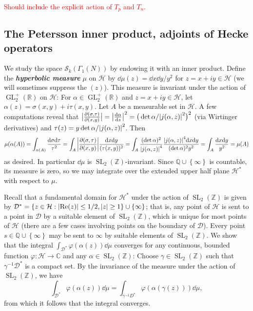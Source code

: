 \documentclass[10pt,leqno,twoside]{article}
\theoremstyle{plain}
\theoremstyle{definition}
\numberwithin{equation}{section}
\numberwithin{lem}{section}
\newcommand{\cbr}[1]{\left\{#1\right\}}
\newcommand{\textib}[1]{\textbf{\textit{#1\index{#1}}}} %
\DeclareMathOperator{\GL}{GL}
\DeclareMathOperator{\SL}{SL}
\newcommand{\slz}{\SL_2(\mathbb{Z})}
\newcommand{\glrp}{\GL_2^+(\mathbb{R})}
\newcommand{\sai}[1]{\textcolor{red}{#1}}
\begin{document}
\sai{Should include the explicit action of $T_p$ and $T_n$.}

\subsection{The Petersson inner product, adjoints of Hecke operators}
We study the space $\mathcal S_k(\varGamma_1(N))$ by endowing it with an inner product. Define the \textib{hyperbolic measure} $\mu$ on $\mathcal H$ by $\dd\mu(z) = \dd x \dd y / y^2$ for $z = x+iy\in\mathcal H$ (we will sometimes suppress the $(z)$). This measure is invariant under the action of $\glrp$ on $\mathcal H$: For $\alpha \in \glrp$ and $z=x+iy \in \mathcal H$, let $\alpha(z) = \sigma(x,y) + i\tau(x,y)$. Let $A$ be a measurable set in $\mathcal H$. A few computations reveal that $\big|\frac{\partial (\sigma,\tau)}{\partial(x,y)}\big| = \abs{\dv{\alpha}{z}}^2 = \big(\det\alpha/\abs{j(\alpha,z)}^2\big)^2$ (via Wirtinger derivatives) and $\tau(z) = y\det\alpha/\abs{j(\alpha,z)}^2$. Then \[\mu(\alpha(A)) = \int_{\alpha(A)} \frac{\dd\sigma\dd\tau}{\tau^2} = \int_{A}\bigg|\frac{\partial (\sigma,\tau)}{\partial(x,y)}\bigg|\frac{\dd x\dd y}{(\tau(x,y))^2} = \int_A \frac{(\det\alpha)^2}{\abs{j(\alpha,z)}^4}\frac{\abs{j(\alpha,z)}^4\dd x \dd y}{(\det\alpha)^2y^2} =\int_A \frac{\dd x \dd y}{y^2} = \mu(A)\]
as desired. In particular $\dd \mu$ is $\slz$-invariant. Since $\mathbb Q\cup\cbr{\infty}$ is countable, its measure is zero, so we may integrate over the extended upper half plane $\mathcal H^\ast$ with respect to $\mu$.

Recall that a fundamental domain for $\mathcal H^\ast$ under the action of $\slz$ is given by $\mathcal D^\ast = \cbr{z\in\mathcal H : \abs{\Re(z)}\leq 1/2,\abs{z}\geq 1}\cup\cbr{\infty}$; that is, any point of $\mathcal H$ is sent to a point in $\mathcal D$ by a suitable element of $\slz$, which is unique for most points of $\mathcal H$ (there are a few cases involving points on the boundary of $\mathcal D$). Every point $s\in\mathbb Q\cup\cbr{\infty}$ may be sent to $\infty$ by suitable elements of $\slz$. We show that the integral $\int_{\mathcal D^\ast} \varphi(\alpha(z))\dd \mu$ converges for any continuous, bounded function $\varphi\colon\mathcal H\to\mathbb C$ and any $\alpha\in\slz$: Choose $\gamma\in\slz$ such that $\gamma^{-1}\mathcal D^\ast$ is a compact set. By the invariance of the measure under the action of $\slz$, we have
\[\int_{\mathcal D^\ast} \varphi(\alpha(z))\dd \mu = \int_{\mathcal \gamma^{-1} D^\ast} \varphi(\alpha(\gamma(z)))\dd \mu, \] from which it follows that the integral converges.
\end{document}
